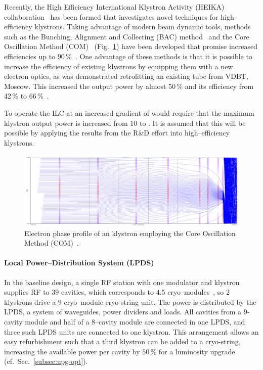 Recently, the High Efficiency International Klystron Activity (HEIKA) collaboration~\cite{Syratchev:2015a, Gerigk:2018ebm} has been formed that investigates novel techniques for high--efficiency klystrons.
Taking advantage of modern beam dynamic tools, methods such as the Bunching, Alignment and Collecting (BAC) method~\cite{Guzilov:2014a} and the Core Oscillation Method (COM)~\cite{Constable:2017hha} (Fig.~\ref{fig:com})
 have been developed that promise increased efficiencies up to $90\,\%$~\cite{Baikov:2015bif}.  
One advantage of these methods is that it is possible to increase the efficiency of existing klystrons by equipping them with a new electron optics, as was demonstrated retrofitting an existing tube from VDBT, Moscow. 
This increased the output power by almost 50\,\% and its efficiency from 42\,\% to 66\,\%~\cite{Jensen:2016a}.

To operate the ILC at an increased gradient of  would require that the maximum klystron output power is increased from $10$ to . 
It is assumed that this will be possible by applying the results from the R\&D effort into high--efficiency klystrons.
 
\begin{figure}[htbp]
   \includegraphics[width=\hsize]{chapters/figures/eefact16-wet3ah2-fig1}
\caption{Electron phase  profile of an  klystron employing the Core Oscillation Method (COM)~\cite{Constable:2017hha}.
}
\label{fig:com}
\end{figure}

\paragraph{Local Power--Distribution System (LPDS)}

In the baseline design, a single RF station with one modulator and klystron supplies RF to $39$ cavities, which corresponds to $4.5$ cryo--modules~\cite[Sec. 3.6.4]{Adolphsen:2013kya}, so $2$ klystrons drive a $9$ cryo--module cryo-string unit.
The power is distributed by the LPDS, a system of waveguides, power dividers and loads. 
All cavities from a $9$-cavity module and half of a $8$--cavity module are connected in one LPDS, and three such LPDS units are connected to one klystron.
This arrangement allows an easy refurbishment such that a third klystron can be added to a cryo-string, increasing the available power per cavity by $50\,\%$ for a luminosity upgrade (cf.\ Sec.~\ref{subsec:upg-opt}).

